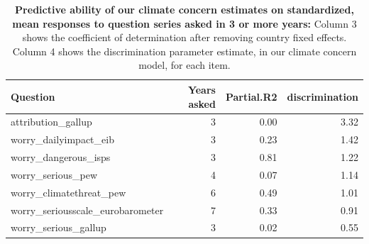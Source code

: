 \begin{table}[ht]
\centering
\begin{tabular}{lrrr}
  \hline
Question & Years asked & Partial.R2 & discrimination \\ 
  \hline
attribution\_gallup &   3 & 0.00 & 3.32 \\ 
  worry\_dailyimpact\_eib &   3 & 0.23 & 1.42 \\ 
  worry\_dangerous\_isps &   3 & 0.81 & 1.22 \\ 
  worry\_serious\_pew &   4 & 0.07 & 1.14 \\ 
  worry\_climatethreat\_pew &   6 & 0.49 & 1.01 \\ 
  worry\_seriousscale\_eurobarometer &   7 & 0.33 & 0.91 \\ 
  worry\_serious\_gallup &   3 & 0.02 & 0.55 \\ 
   \hline
\end{tabular}
\caption{{\bf Predictive ability of our climate concern estimates on standardized, mean responses to question series asked in 3 or more years: } Column 3 shows the coefficient of determination after removing country fixed effects. Column 4 shows the discrimination parameter estimate, in our climate concern model, for each item.} 
\label{tab:timeseries}
\end{table}
